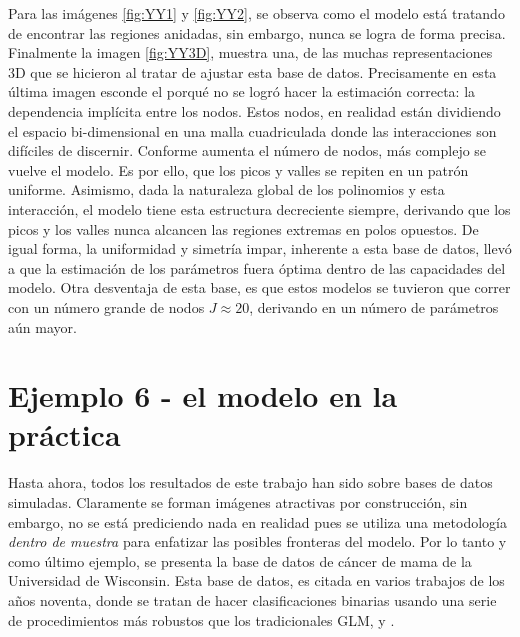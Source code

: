 \documentclass[../Main/Main.tex]{subfiles}
\begin{document}
Para las imágenes \ref{fig:YY1} y \ref{fig:YY2}, se observa como el modelo está tratando de encontrar las regiones anidadas, sin embargo, nunca se logra de forma precisa. Finalmente la imagen \ref{fig:YY3D}, muestra una, de las muchas representaciones 3D que se hicieron al tratar de ajustar esta base de datos. Precisamente en esta última imagen esconde el porqué no se logró hacer la estimación correcta: la dependencia implícita entre los nodos. Estos nodos, en realidad están dividiendo el espacio bi-dimensional en una malla cuadriculada donde las interacciones son difíciles de discernir. Conforme aumenta el número de nodos, más complejo se vuelve el modelo. Es por ello, que los picos y valles se repiten en un patrón uniforme. Asimismo, dada la naturaleza global de los polinomios y esta interacción, el modelo tiene esta estructura decreciente siempre, derivando que los picos y los valles nunca alcancen las regiones extremas en polos opuestos. De igual forma, la uniformidad y simetría impar, inherente a esta base de datos, llevó a que la estimación de los parámetros fuera óptima dentro de las capacidades del modelo. Otra desventaja de esta base, es que estos modelos se tuvieron que correr con un número grande de nodos $J \approx 20$, derivando en un número de parámetros aún mayor.

\section{Ejemplo 6 - el modelo en la práctica} \label{sec:T6}
Hasta ahora, todos los resultados de este trabajo han sido sobre bases de datos simuladas. Claramente  se forman imágenes atractivas por construcción, sin embargo, no se está prediciendo nada en realidad pues se utiliza una metodología \textit{dentro de muestra} para enfatizar las posibles fronteras del modelo. Por lo tanto y como último ejemplo, se presenta la base de datos de cáncer de mama de la Universidad de Wisconsin. Esta base de datos, es citada en varios trabajos de los años noventa, donde se tratan de hacer clasificaciones binarias usando una serie de procedimientos más robustos que los tradicionales GLM,  \citet{mangasarian1990pattern} y \citet{bennett1992robust}.
\end{document}
